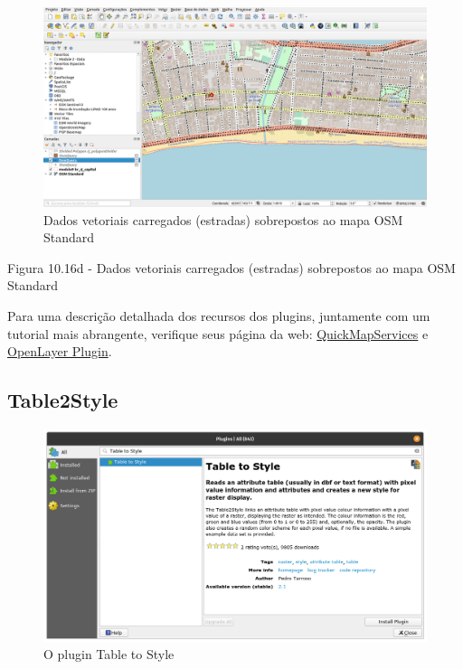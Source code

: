 \documentclass[
]{krantz}
\begin{document}
\begin{figure}
\centering
\includegraphics{media/modulo10/fig1016_d.png}
\caption{Dados vetoriais carregados (estradas) sobrepostos ao mapa OSM Standard}
\end{figure}

Figura 10.16d - Dados vetoriais carregados (estradas) sobrepostos ao mapa OSM Standard

Para uma descrição detalhada dos recursos dos plugins, juntamente com um tutorial mais abrangente, verifique seus página da web: \href{https://nextgis.com/blog/quickmapservices/}{QuickMapServices} e \href{https://github.com/sourcepole/qgis-openlayers-plugin}{OpenLayer Plugin}.

\hypertarget{table2style}{%
\subsection{Table2Style}\label{table2style}}

\begin{figure}
\centering
\includegraphics{media/modulo10/fig1017_a.png}
\caption{O plugin Table to Style}
\end{figure}
\end{document}
